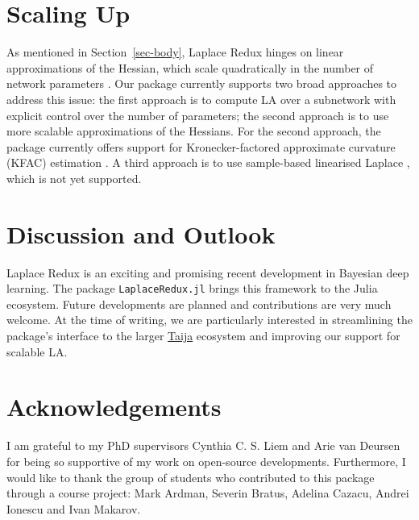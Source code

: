 \documentclass{juliacon}
\begin{document}
\section{Scaling Up}\label{sec-scale}

As mentioned in Section~\ref{sec-body}, Laplace Redux hinges on linear
approximations of the Hessian, which scale quadratically in the number
of network parameters \cite{daxberger2021laplace}. Our package currently
supports two broad approaches to address this issue: the first approach
is to compute LA over a subnetwork with explicit control over the number
of parameters; the second approach is to use more scalable
approximations of the Hessians. For the second approach, the package
currently offers support for Kronecker-factored approximate curvature
(KFAC) estimation \cite{martens2020optimizing}. A third approach is to
use sample-based linearised Laplace \cite{antoran2023samplingbased},
which is not yet supported.

\section{Discussion and Outlook}\label{sec-con}

Laplace Redux is an exciting and promising recent development in
Bayesian deep learning. The package \texttt{LaplaceRedux.jl} brings this
framework to the Julia ecosystem. Future developments are planned and
contributions are very much welcome. At the time of writing, we are
particularly interested in streamlining the package's interface to the
larger \href{https://github.com/JuliaTrustworthyAI}{Taija} ecosystem and
improving our support for scalable LA.

\section{Acknowledgements}\label{sec-ack}

I am grateful to my PhD supervisors Cynthia C. S. Liem and Arie van
Deursen for being so supportive of my work on open-source developments.
Furthermore, I would like to thank the group of students who contributed
to this package through a course project: Mark Ardman, Severin Bratus,
Adelina Cazacu, Andrei Ionescu and Ivan Makarov.


\printbibliography
\end{document}
